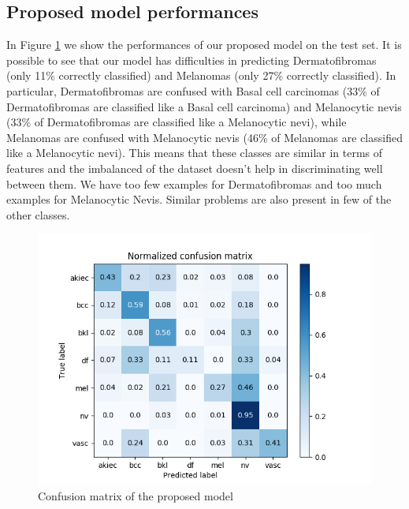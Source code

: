 	\subsection{Proposed model performances}
	
		In Figure \ref{fig:first-matrix} we show the performances of our proposed model on the test set. It is possible to see that our model has difficulties in predicting Dermatofibromas (only 11\% correctly classified) and Melanomas (only 27\% correctly classified). In particular, Dermatofibromas are confused with Basal cell carcinomas (33\% of Dermatofibromas are classified like a Basal cell carcinoma) and Melanocytic nevis (33\% of Dermatofibromas are classified like a Melanocytic nevi), while Melanomas are confused with Melanocytic nevis (46\% of Melanomas are classified like a Melanocytic nevi). 
		This means that these classes are similar in terms of features and the imbalanced of the dataset doesn’t help in discriminating well between them. We have too few examples for Dermatofibromas and too much examples for Melanocytic Nevis. Similar problems are also present in few of the other classes.
		
		\begin{figure}[H]
			\centering
			\includegraphics[width=15cm]{images/firstMatrix.png}
			\caption{Confusion matrix of the proposed model}
			\label{fig:first-matrix}
		\end{figure}	
			
			
		
		
		
		
		
		
		